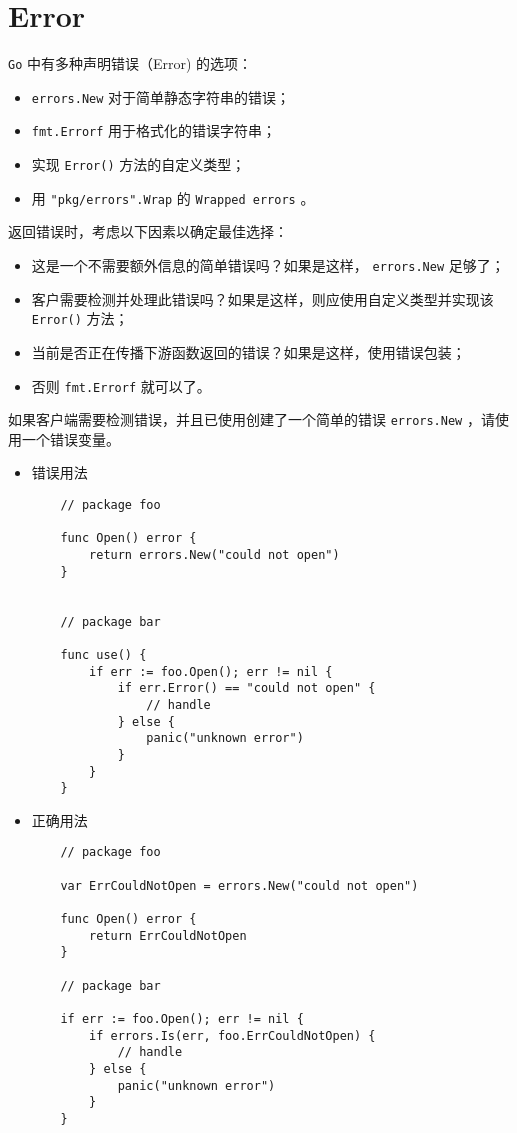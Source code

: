 \chapter{Error}
\texttt{Go} 中有多种声明错误（Error) 的选项：
\begin{itemize}[leftmargin=4em]
\item \texttt{errors.New} 对于简单静态字符串的错误；
\item \texttt{fmt.Errorf} 用于格式化的错误字符串；
\item 实现 \texttt{Error()} 方法的自定义类型；
\item 用 \texttt{"pkg/errors".Wrap} 的 \texttt{Wrapped errors} 。
\end{itemize}

返回错误时，考虑以下因素以确定最佳选择：
\begin{itemize}[leftmargin=4em]
\item 这是一个不需要额外信息的简单错误吗？如果是这样， \texttt{errors.New} 足够了；
\item 客户需要检测并处理此错误吗？如果是这样，则应使用自定义类型并实现该 \texttt{Error()} 方法；
\item 当前是否正在传播下游函数返回的错误？如果是这样，使用错误包装；
\item 否则 \texttt{fmt.Errorf} 就可以了。
\end{itemize}

如果客户端需要检测错误，并且已使用创建了一个简单的错误 \texttt{errors.New} ，请使用一个错误变量。
\begin{itemize}[leftmargin=4em]
\item 错误用法

  \begin{verbatim}
    // package foo

    func Open() error {
    	return errors.New("could not open")
    }


    // package bar

    func use() {
    	if err := foo.Open(); err != nil {
    		if err.Error() == "could not open" {
    			// handle
    		} else {
    			panic("unknown error")
    		}
    	}
    }
  \end{verbatim}
\item 正确用法

  \begin{verbatim}
    // package foo

    var ErrCouldNotOpen = errors.New("could not open")

    func Open() error {
    	return ErrCouldNotOpen
    }

    // package bar

    if err := foo.Open(); err != nil {
    	if errors.Is(err, foo.ErrCouldNotOpen) {
    		// handle
    	} else {
    		panic("unknown error")
    	}
    }
  \end{verbatim}
\end{itemize}

